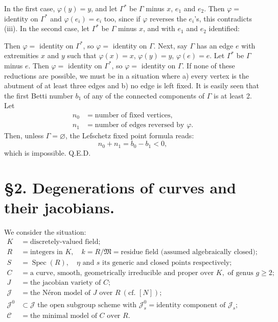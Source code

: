 \documentclass[10pt]{article}
\newcommand{\Spec}{\operatorname{Spec}}
\newcommand{\QED}{\hfill Q.E.D.}
\begin{document}
In the first case, $\varphi(y)=y$, and let $\Gamma^*$ be $\Gamma$ minus $x$, $e_1$ and $e_2$. Then $\varphi=$ identity on $\Gamma^*$ and $\varphi(e_i)=e_i$ too, since if $\varphi$ reverses the $e_i$'s, this contradicts (iii). In the second case, let $\Gamma^*$ be $\Gamma$ minus $x$, and with $e_1$ and $e_2$ identified:

\begin{center}
\end{center}

Then $\varphi=$ identity on $\Gamma^*$, so $\varphi=$ identity on $\Gamma$. Next, say $\Gamma$ has an edge $e$ with extremities $x$ and $y$ such that $\varphi(x)=x$, $\varphi(y)=y$, $\varphi(e)=e$. Let $\Gamma^*$ be $\Gamma$ minus $e$. Then $\varphi=$ identity on $\Gamma^*$, so $\varphi=$ identity on $\Gamma$. If none of these reductions are possible, we must be in a situation where a) every vertex is the abutment of at least three edges and b) no edge is left fixed. It is easily seen that the first Betti number $b_1$ of any of the connected components of $\Gamma$ is at least 2. Let
\[
\begin{aligned}
n_0&=\text{number of fixed vertices},\\
n_1&=\text{number of edges reversed by }\varphi.
\end{aligned}
\]
Then, unless $\Gamma=\varnothing$, the Lefschetz fixed point formula reads:
\[
n_0+n_1=b_0-b_1<0,
\]
which is impossible. \QED

\section*{\S 2. Degenerations of curves and their jacobians.}

We consider the situation:
\begin{align*}
K&=\text{discretely-valued field};\\
R&=\text{integers in }K,\quad k=R/\mathfrak M=\text{residue field (assumed algebraically closed)};\\
S&=\Spec(R),\quad \eta\text{ and }s\text{ its generic and closed points respectively};\\
C&=\text{a curve, smooth, geometrically irreducible and proper over }K,\text{ of genus }g\geq2;\\
J&=\text{the jacobian variety of }C;\\
\mathscr J&=\text{the N\'eron model of }J\text{ over }R\ (\text{cf. }[N]);\\
\mathscr J^0&\subset\mathscr J\text{ the open subgroup scheme with }\mathscr J_s^0=\text{identity component of }\mathscr J_s;\\
\mathscr C&=\text{the minimal model of }C\text{ over }R.
\end{align*}
\end{document}
